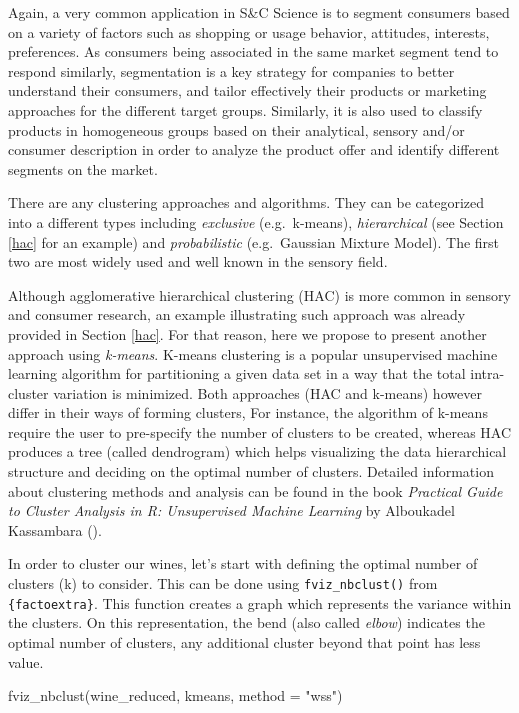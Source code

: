 \documentclass[
]{krantz}
\makeatletter
\newenvironment{Shaded}{\begin{snugshade}}{\end{snugshade}}
\newcommand{\AttributeTok}[1]{\textcolor[rgb]{0.61,0.61,0.61}{#1}}
\newcommand{\FunctionTok}[1]{\textcolor[rgb]{0,0,0}{#1}}
\newcommand{\NormalTok}[1]{#1}
\newcommand{\StringTok}[1]{\textcolor[rgb]{0.5,0.5,0.5}{#1}}
\newenvironment{kframe}{%
\medskip{}
\setlength{\fboxsep}{.8em}
 \def\at@end@of@kframe{}%
 \ifinner\ifhmode%
  \def\at@end@of@kframe{\end{minipage}}%
  \begin{minipage}{\columnwidth}%
 \fi\fi%
 \def\FrameCommand##1{\hskip\@totalleftmargin \hskip-\fboxsep
 \colorbox{shadecolor}{##1}\hskip-\fboxsep
     \hskip-\linewidth \hskip-\@totalleftmargin \hskip\columnwidth}%
 \MakeFramed {\advance\hsize-\width
   \@totalleftmargin\z@ \linewidth\hsize
   \@setminipage}}%
 {\par\unskip\endMakeFramed%
 \at@end@of@kframe}
\renewenvironment{Shaded}{\begin{kframe}}{\end{kframe}}
\makeatother
\begin{document}
Again, a very common application in S\&C Science is to segment consumers based on a variety of factors such as shopping or usage behavior, attitudes, interests, preferences. As consumers being associated in the same market segment tend to respond similarly, segmentation is a key strategy for companies to better understand their consumers, and tailor effectively their products or marketing approaches for the different target groups. Similarly, it is also used to classify products in homogeneous groups based on their analytical, sensory and/or consumer description in order to analyze the product offer and identify different segments on the market.

There are any clustering approaches and algorithms. They can be categorized into a different types including \emph{exclusive} (e.g.~k-means), \emph{hierarchical} (see Section \ref{hac} for an example) and \emph{probabilistic} (e.g.~Gaussian Mixture Model). The first two are most widely used and well known in the sensory field.

Although agglomerative hierarchical clustering (HAC) is more common in sensory and consumer research, an example illustrating such approach was already provided in Section \ref{hac}. For that reason, here we propose to present another approach using \emph{k-means}.
K-means clustering is a popular unsupervised machine learning algorithm for partitioning a given data set in a way that the total intra-cluster variation is minimized. Both approaches (HAC and k-means) however differ in their ways of forming clusters, For instance, the algorithm of k-means require the user to pre-specify the number of clusters to be created, whereas HAC produces a tree (called dendrogram) which helps visualizing the data hierarchical structure and deciding on the optimal number of clusters. Detailed information about clustering methods and analysis can be found in the book \emph{Practical Guide to Cluster Analysis in R: Unsupervised Machine Learning} by Alboukadel Kassambara (\citet{Kassambara2017}).

In order to cluster our wines, let's start with defining the optimal number of clusters (k) to consider. This can be done using \texttt{fviz\_nbclust()} from \texttt{\{factoextra\}}. This function creates a graph which represents the variance within the clusters. On this representation, the bend (also called \emph{elbow}) indicates the optimal number of clusters, any additional cluster beyond that point has less value.

\begin{Shaded}
\begin{Highlighting}[]
\FunctionTok{fviz\_nbclust}\NormalTok{(wine\_reduced, kmeans, }\AttributeTok{method =} \StringTok{"wss"}\NormalTok{)}
\end{Highlighting}
\end{Shaded}
\end{document}
